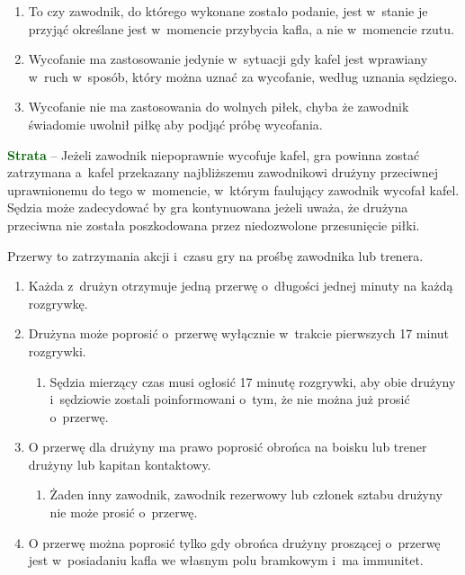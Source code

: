 \documentclass[12pt,a4paper]{article}
\renewcommand{\subsubsection}[1]{
  \oldsubsubsection{#1}%
  \leftskip1.3cm
}
\renewcommand{\paragraph}[1]{
  \oldparagraph{#1}%
  \leftskip2cm
}
\newcommand\other[1]{\bgroup\textcolor{darkgreen}{\textbf{#1}}}
\begin{document}
\begin{enumerate}
	\item
		To czy zawodnik, do którego wykonane zostało podanie,
		jest w~stanie je przyjąć określane jest w~momencie przybycia kafla, a
	      nie w~momencie rzutu.
	\item
	      Wycofanie ma zastosowanie jedynie w~sytuacji gdy kafel jest wprawiany
	      w~ruch w~sposób, który można uznać za wycofanie, według uznania
	      sędziego.
	\item
	      Wycofanie nie ma zastosowania do wolnych piłek, chyba że zawodnik
	      świadomie uwolnił piłkę aby podjąć próbę wycofania.
\end{enumerate}

\other{Strata} -- Jeżeli zawodnik niepoprawnie wycofuje kafel, gra powinna
zostać zatrzymana a~kafel przekazany najbliższemu zawodnikowi drużyny
przeciwnej uprawnionemu do tego w~momencie, w~którym faulujący zawodnik
wycofał kafel. Sędzia może zadecydować by gra kontynuowana jeżeli uważa,
że drużyna przeciwna nie została poszkodowana przez niedozwolone
przesunięcie piłki.

\subsubsection{Przerwy}

Przerwy to zatrzymania akcji i~czasu gry na prośbę zawodnika lub trenera.

\paragraph{Zgłaszanie przerw:}

\begin{enumerate}
	\item
	      Każda z~drużyn otrzymuje jedną przerwę o~długości jednej minuty na
	      każdą rozgrywkę.
	\item
	      Drużyna może poprosić o~przerwę wyłącznie w~trakcie pierwszych 17
	      minut rozgrywki.

	      \begin{enumerate}
		      \item
		            Sędzia mierzący czas musi ogłosić 17 minutę rozgrywki, aby obie
		            drużyny i~sędziowie zostali poinformowani o~tym, że nie można już
		            prosić o~przerwę.
	      \end{enumerate}
	\item
	      O przerwę dla drużyny ma prawo poprosić obrońca na boisku lub trener
	      drużyny lub kapitan kontaktowy.

	      \begin{enumerate}
		      \item
		            Żaden inny zawodnik, zawodnik rezerwowy lub członek sztabu drużyny
		            nie może prosić o~przerwę.
	      \end{enumerate}
	\item
	      O przerwę można poprosić tylko gdy obrońca drużyny proszącej o~przerwę
	      jest w~posiadaniu kafla we własnym polu bramkowym i~ma immunitet.
\end{enumerate}
\end{document}
